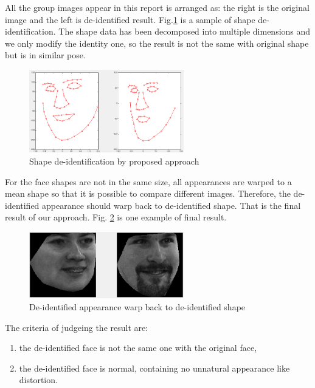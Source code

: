 	All the group images appear in this report is arranged as: the right is the original image and the left is de-identified result. Fig.\ref{fig:shape_recon} is a sample of shape de-identification. The shape data has been decomposed into multiple dimensions and we only modify the identity one, so the result is not the same with original shape but is in similar pose.

	\begin{figure}[!htb]
		  \centering
		  \includegraphics[width=0.6\textwidth]{figure/shape_recon}
		  \caption{Shape de-identification by proposed approach}
		  \label{fig:shape_recon}
	\end{figure}

	For the face shapes are not in the same size, all appearances are warped to a mean shape so that it is possible to compare different images. Therefore, the de-identified appearance should warp back to de-identified shape. That is the final result of our approach. Fig. \ref{fig:tensor_result_1} is one example of final result.

		\begin{figure}[!htb]
		  \centering
		  \includegraphics[width=0.6\textwidth]{figure/right_smile}
		  \caption{De-identified appearance warp back to de-identified shape}
		  \label{fig:tensor_result_1}
		\end{figure}

	The criteria of judgeing the result are:
	\begin{enumerate}
		\item the de-identified face is not the same one with the original face,
		\item the de-identified face is normal, containing no unnatural appearance like distortion.
	\end{enumerate}


